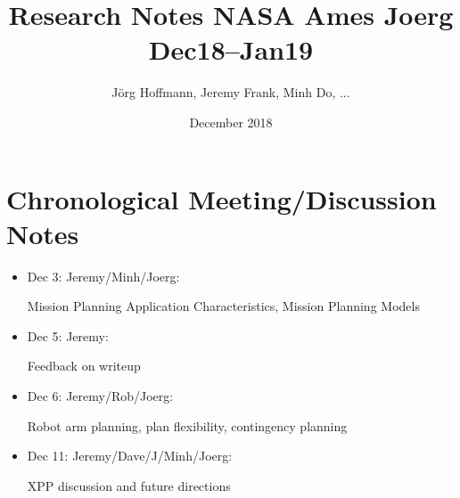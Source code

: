 \documentclass[fontsize=11pt]{scrartcl}
\title{Research Notes NASA Ames Joerg Dec18--Jan19}
\author{J\"org Hoffmann, Jeremy Frank, Minh Do, ... }
\date{December 2018}
\begin{document}
\maketitle













\appendix






\section{Chronological Meeting/Discussion Notes}

\begin{itemize}
\item Dec 3: Jeremy/Minh/Joerg: 

    Mission Planning Application Characteristics, Mission Planning Models

\item Dec 5: Jeremy: 

    Feedback on writeup
    
\item Dec 6: Jeremy/Rob/Joerg: 

    Robot arm planning, plan flexibility, contingency planning
        
\item Dec 11: Jeremy/Dave/J/Minh/Joerg: 

    XPP discussion and future directions

\end{itemize}
\end{document}

